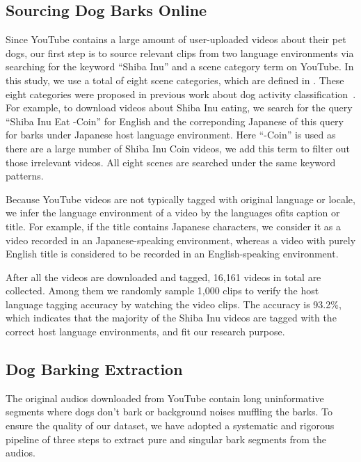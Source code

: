  
\subsection{Sourcing Dog Barks Online}
\label{sec:source}
Since YouTube contains a large amount of user-uploaded videos about their pet dogs, our first step is to source relevant clips from two language environments via searching for the keyword
``Shiba Inu'' and a scene category term on YouTube. In this study, we use a total of eight scene
categories, which are defined in . These eight categories were proposed
in previous work about dog activity classification~\cite{larranaga2015comparing}. 
For example, to download videos about Shiba Inu eating, we search for
the query ``Shiba Inu Eat -Coin'' for English and the correponding Japanese of this query for barks under Japanese host language environment. Here ``-Coin'' is used as there are a large number of Shiba Inu Coin videos, we add this term to filter out those irrelevant videos. All eight scenes are searched under the same keyword patterns.

Because YouTube videos are not typically tagged with original language or locale, we infer the language environment of a video by the languages ofits caption or title. For example, if the title contains Japanese characters, we consider it as a video recorded in an Japanese-speaking environment, whereas a video with purely English title is considered to be recorded in an English-speaking environment. 

After all the videos are downloaded and tagged, 16,161 videos in total are collected. Among them we randomly sample 1,000 clips to verify the host language tagging accuracy by watching the video clips. The accuracy is 93.2\%, which indicates that the majority of the Shiba Inu videos are tagged with the correct host language environments, and fit our research purpose.




\subsection{Dog Barking Extraction}
\label{sec:barkextraction}
The original audios downloaded from YouTube contain long uninformative segments where dogs don't bark or background noises muffling the barks. To ensure the quality of 
our dataset, we have adopted a systematic and rigorous pipeline of three steps 
to extract pure and singular bark segments from the audios.


